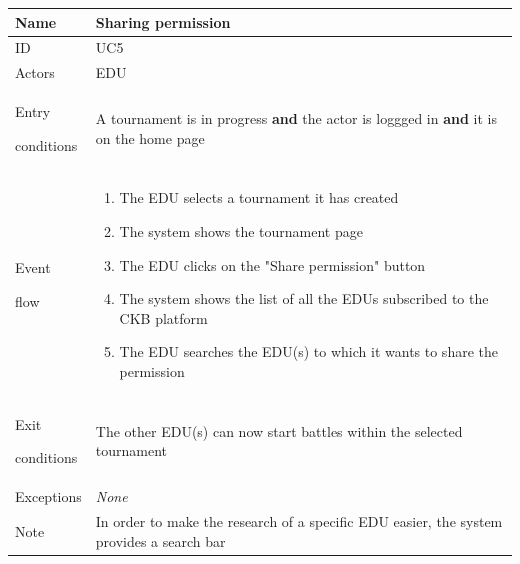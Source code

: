 \begin{center}
    \def\arraystretch{1.5}
    \begin{tabular}{| m{2cm} | m{10cm}|}
        \hline
        Name                  & Sharing permission                                                                                   \\ \hline
        ID                    & UC5                                                                                                  \\ \hline
        Actors                & EDU                                                                                                  \\ \hline
        Entry \par conditions & A tournament is in progress \textbf{and} the actor is loggged in \textbf{and} it is on the home page \\ \hline
        Event \par flow       & \begin{enumerate}
                                    \item The EDU selects a tournament it has created
                                    \item The system shows the tournament page
                                    \item The EDU clicks on the "Share permission" button
                                    \item The system shows the list of all the EDUs subscribed to the CKB platform
                                    \item The EDU searches the EDU(s) to which it wants to share the permission
                                \end{enumerate}                        \\ \hline
        Exit \par conditions  & The other EDU(s) can now start battles within the selected tournament                                \\ \hline
        Exceptions            & \textit{None}                                                                                        \\ \hline
        Note                  & In order to make the research of a specific EDU easier, the system provides a search bar             \\ \hline
    \end{tabular}
\end{center}

